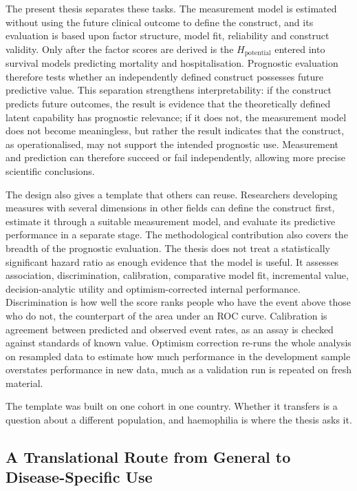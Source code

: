 The present thesis separates these tasks. The measurement model is estimated without using the future clinical outcome to define the construct, and its evaluation is based upon factor structure, model fit, reliability and construct validity. Only after the factor scores are derived is the $H_{\text{potential}}$ entered into survival models predicting mortality and hospitalisation. Prognostic evaluation therefore tests whether an independently defined construct possesses future predictive value. This separation strengthens interpretability: if the construct predicts future outcomes, the result is evidence that the theoretically defined latent capability has prognostic relevance; if it does not, the measurement model does not become meaningless, but rather the result indicates that the construct, as operationalised, may not support the intended prognostic use. Measurement and prediction can therefore succeed or fail independently, allowing more precise scientific conclusions.

The design also gives a template that others can reuse. Researchers developing measures with several dimensions in other fields can define the construct first, estimate it through a suitable measurement model, and evaluate its predictive performance in a separate stage. The methodological contribution also covers the breadth of the prognostic evaluation. The thesis does not treat a statistically significant hazard ratio as enough evidence that the model is useful. It assesses association, discrimination, calibration, comparative model fit, incremental value, decision-analytic utility and optimism-corrected internal performance. Discrimination is how well the score ranks people who have the event above those who do not, the counterpart of the area under an ROC curve. Calibration is agreement between predicted and observed event rates, as an assay is checked against standards of known value. Optimism correction re-runs the whole analysis on resampled data to estimate how much performance in the development sample overstates performance in new data, much as a validation run is repeated on fresh material.

The template was built on one cohort in one country. Whether it transfers
is a question about a different population, and haemophilia is where the thesis
asks it.

\subsection{A Translational Route from General to Disease-Specific Use}

